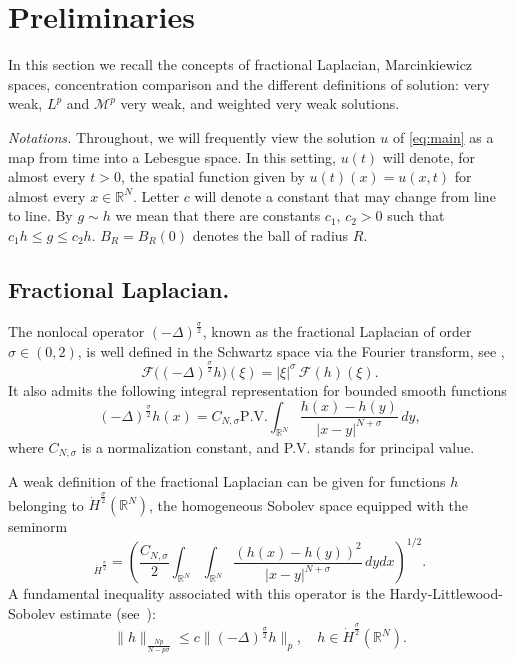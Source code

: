 \documentclass[leqno,12pt]{amsart}
\theoremstyle{definition}
\theoremstyle{remark}
\numberwithin{equation}{section}
\begin{document}
\section{Preliminaries}
\label{sect:Preliminaries}

In this section we recall the concepts of fractional Laplacian, Marcinkiewicz  spaces, concentration comparison and the different definitions of solution: very weak, $L^p$ and $\mathcal{M}^p$ very weak, and weighted very weak solutions. 

\noindent\emph{Notations. } Throughout, we will frequently view the solution $u$ of \eqref{eq:main} as a map from time into a Lebesgue space. In this setting, $u(t)$ will denote, for almost every $t>0$,  the spatial function given by $u(t)(x)=u(x,t)$  for almost every $x\in\mathbb{R}^N$. Letter $c$ will denote a constant  that may change from line to line. By $g\sim h$ we mean that there are constants $c_1,\,c_2>0$ such that $c_1 h\le g\le c_2 h$. $B_R=B_R(0)$ denotes the ball of radius $R$.

\subsection*{Fractional Laplacian.} 
The nonlocal operator $(-\Delta)^{\frac\sigma2}$, known as the fractional Laplacian of order $\sigma\in(0,2)$, is well defined in the Schwartz space via the Fourier transform, see \cite{Stein-1970},
\[
\mathcal{F}\big( (-\Delta)^{\frac\sigma2} h \big)(\xi)
= |\xi|^{\sigma}\,\mathcal{F}(h)(\xi).
\]
It also admits the following integral representation for bounded smooth functions
$$
    (-\Delta)^{\frac\sigma2}h(x)=C_{N,\sigma}\text{P.V.}\int_{\mathbb{R}^N}\frac{h(x)-h(y)}{|x-y|^{N+\sigma}}\,dy,
$$
where $C_{N,\sigma}$ is a normalization constant, and P.V. stands for principal value. 

A weak definition of the fractional Laplacian can be given for functions $h$ belonging to $\dot{H}^{\frac\sigma2}(\mathbb{R}^N)$, the homogeneous Sobolev space equipped with the seminorm 
\begin{equation*}
[h]_{\dot{H}^{\frac\sigma2}}=\left(\frac{C_{N,\sigma}}{2}\int_{\mathbb{R}^N}\int_{\mathbb{R}^N}\frac{(h(x)-h(y))^2}{|x-y|^{N+\sigma}}\,dydx\right)^{1/2}.
\end{equation*}
A fundamental inequality associated with this operator is the Hardy-Littlewood-Sobolev estimate (see~\cite{Lieb}):
\[
    \|h\|_{\frac{Np}{N-p\sigma}}\leq c\|(-\Delta)^{\frac\sigma2}h\|_p, \quad h\in\dot{H}^{\frac\sigma2}(\mathbb{R}^N).
\]
\end{document}

